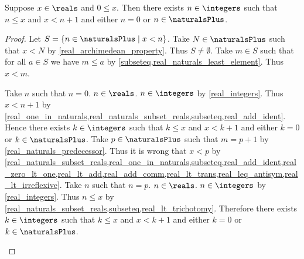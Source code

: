 \begin{lemma}\label{real_consecutive_integers_nonneg}
    Suppose $x\in\reals$ and $0 \leq x$.
    Then there exists $n\in\integers$ such that $n \leq x$ and $x < n + 1$ and either $n = 0$ or $n\in\naturalsPlus$.
\end{lemma}
\begin{proof}
    Let $S = \{ n\in\naturalsPlus \mid x < n\}$.
    Take $N\in\naturalsPlus$ such that $x < N$ by \cref{real_archimedean_property}.
    Thus $S\neq \emptyset$.
    Take $m\in S$ such that for all $a\in S$ we have $m \leq a$ by \cref{subseteq,real_naturals_least_element}.
    Thus $x < m$.
    \begin{byCase}
        Take $n$ such that $n = 0$.
        $n \in \reals$.
        $n\in\integers$ by \cref{real_integers}.
        Thus $x < n + 1$ by \cref{real_one_in_naturals,real_naturals_subset_reals,subseteq,real_add_ident}.
        Hence there exists $k\in\integers$ such that $k \leq x$ and $x < k + 1$ and either $k = 0$ or $k\in\naturalsPlus$.
        Take $p\in\naturalsPlus$ such that $m = p + 1$ by \cref{real_naturals_predecessor}.
        Thus it is wrong that $x < p$ by \cref{real_naturals_subset_reals,real_one_in_naturals,subseteq,real_add_ident,real_zero_lt_one,real_lt_add,real_add_comm,real_lt_trans,real_leq_antisym,real_lt_irreflexive}.
        Take $n$ such that $n = p$.
        $n \in \reals$.
        $n\in\integers$ by \cref{real_integers}.
        Thus $n \leq x$ by \cref{real_naturals_subset_reals,subseteq,real_lt_trichotomy}.
        Therefore there exists $k\in\integers$ such that $k \leq x$ and $x < k + 1$ and either $k = 0$ or $k\in\naturalsPlus$.
    \end{byCase}
\end{proof}

